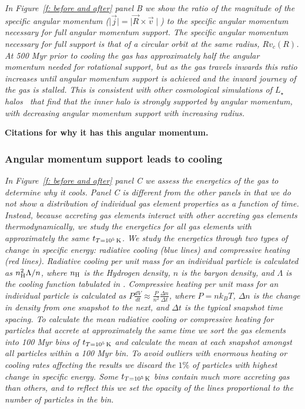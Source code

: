 \documentclass[fleqn,usenatbib]{mnras}
\newcommand{\tcon}{t_{T=10^5\,{\rm K}}}
\newcommand{\nH}{n_{\rm H}}
\begin{document}
\textit{
In Figure~\ref{f: before and after} panel B we show the ratio of the magnitude of the specific angular momentum ($\mid \vec j \mid = \mid \vec R \times \vec v \mid$) to the specific angular momentum necessary for full angular momentum support.
The specific angular momentum necessary for full support is that of a circular orbit at the same radius, $R v_c(R)$.
At 500 Myr prior to cooling the gas has approximately half the angular momentum needed for rotational support, but as the gas travels inwards this ratio increases until angular momentum support is achieved and the inward journey of the gas is stalled.
This is consistent with other cosmological simulations of $L_\star$ halos~\citep[e.g.][]{Oppenheimer2018} that find that the inner halo is strongly supported by angular momentum, with decreasing angular momentum support with increasing radius.
}

\textbf{Citations for why it has this angular momentum.}

\subsubsection{Angular momentum support leads to cooling}

\textit{
In Figure~\ref{f: before and after} panel C we assess the energetics of the gas to determine why it cools.
Panel C is different from the other panels in that we do not show a distribution of individual gas element properties as a function of time.
Instead, because accreting gas elements interact with other accreting gas elements thermodynamically, we study the energetics for all gas elements with approximately the same $\tcon$.
We study the energetics through two types of change in specific energy: radiative cooling (blue lines) and compressive heating (red lines).
Radiative cooling per unit mass for an individual particle is calculated as $\nH^2 \Lambda / n$, where $\nH$ is the Hydrogen density, $n$ is the baryon density, and $\Lambda$ is the cooling function tabulated in \cite{Wiersma2009a}.
Compressive heating per unit mass for an individual particle is calculated as $P \frac{dV}{dt} \approx \frac{ P }{ n^2 } \frac{ \Delta n }{ \Delta t }$, where $P = n k_B T$, $\Delta n$ is the change in density from one snapshot to the next, and $\Delta t$ is the typical snapshot time spacing.
To calculate the mean radiative cooling or compressive heating for particles that accrete at approximately the same time we sort the gas elements into 100 Myr bins of $\tcon$ and calculate the mean at each snapshot amongst all particles within a 100 Myr bin.
To avoid outliers with enormous heating or cooling rates affecting the results we discard the $1\%$ of particles with highest change in specific energy.
Some $\tcon$ bins contain much more accreting gas than others, and to reflect this we set the opacity of the lines proportional to the number of particles in the bin.
}
\end{document}
